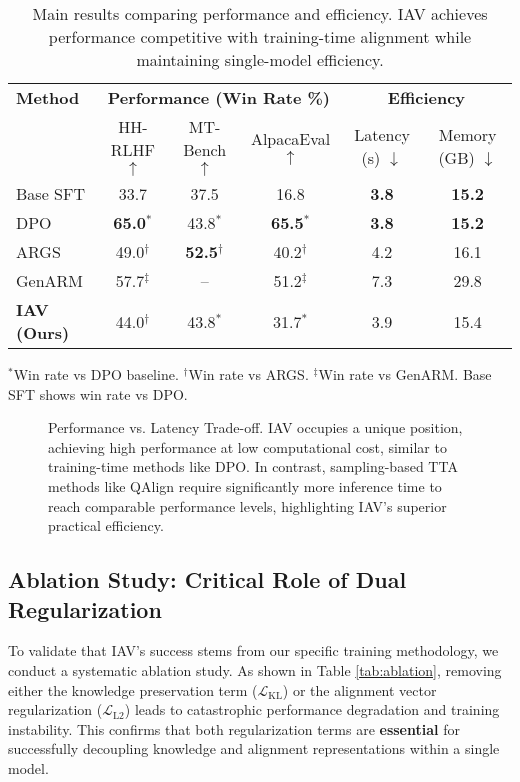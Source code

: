 \documentclass{article} %
\begin{document}
\begin{table}[h!]
\centering
\caption{Main results comparing performance and efficiency. IAV achieves performance competitive with training-time alignment while maintaining single-model efficiency.}
\label{tab:main_results}
\begin{tabular}{@{}l|ccc|cc@{}}
\toprule
\textbf{Method} & \multicolumn{3}{c|}{\textbf{Performance (Win Rate \%)}} & \multicolumn{2}{c}{\textbf{Efficiency}} \\
& HH-RLHF $\uparrow$ & MT-Bench $\uparrow$ & AlpacaEval $\uparrow$ & Latency (s) $\downarrow$ & Memory (GB) $\downarrow$ \\
\midrule
Base SFT & 33.7 & 37.5 & 16.8 & \textbf{3.8} & \textbf{15.2} \\
DPO & \textbf{65.0}$^*$ & 43.8$^*$ & \textbf{65.5}$^*$ & \textbf{3.8} & \textbf{15.2} \\
\midrule
ARGS & 49.0$^\dagger$ & \textbf{52.5}$^\dagger$ & 40.2$^\dagger$ & 4.2 & 16.1 \\
GenARM & 57.7$^\ddagger$ & -- & 51.2$^\ddagger$ & 7.3 & 29.8 \\
\textbf{IAV (Ours)} & 44.0$^\dagger$ & 43.8$^*$ & 31.7$^*$ & 3.9 & 15.4 \\
\bottomrule
\end{tabular}
\vspace{0.5em}
\footnotesize{$^*$Win rate vs DPO baseline. $^\dagger$Win rate vs ARGS. $^\ddagger$Win rate vs GenARM. Base SFT shows win rate vs DPO.}
\end{table}


\begin{figure}[h!]
    \centering
    \vspace{2cm} 
    \caption{Performance vs. Latency Trade-off. IAV occupies a unique position, achieving high performance at low computational cost, similar to training-time methods like DPO. In contrast, sampling-based TTA methods like QAlign require significantly more inference time to reach comparable performance levels, highlighting IAV's superior practical efficiency.}
    \label{fig:perf_latency_tradeoff}
\end{figure}

\subsection{Ablation Study: Critical Role of Dual Regularization}
To validate that IAV's success stems from our specific training methodology, we conduct a systematic ablation study. As shown in Table \ref{tab:ablation}, removing either the knowledge preservation term ($\mathcal{L}_{\text{KL}}$) or the alignment vector regularization ($\mathcal{L}_{\text{L2}}$) leads to catastrophic performance degradation and training instability. This confirms that both regularization terms are \textbf{essential} for successfully decoupling knowledge and alignment representations within a single model.
\end{document}
